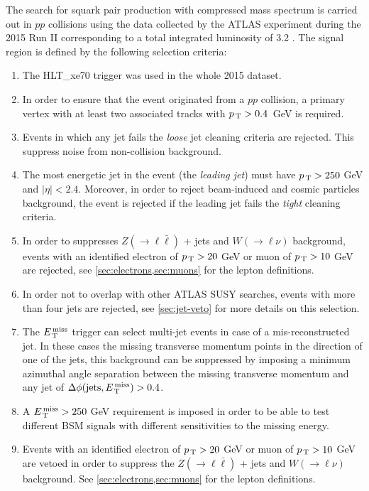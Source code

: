 The search for squark pair production with compressed mass spectrum is carried
out in $pp$ collisions using the data collected by the ATLAS experiment during
the 2015 Run II corresponding to a total integrated luminosity of 3.2 \ifb. The
signal region is defined by the following selection criteria:
\begin{enumerate}[A -]
\item The HLT\_xe70 trigger was used in the whole 2015 dataset.
\item In order to ensure that the event originated from a $pp$ collision, a
  primary vertex with at least two associated tracks with $p_\mathrm{\, T} > 0.4$~GeV is
  required.
\item Events in which any jet fails the \emph{loose} jet cleaning criteria are
  rejected. This suppress noise from non-collision background.
\item The most energetic jet in the event (the \emph{leading jet}) must have
  $p_\mathrm{\, T} > 250~$GeV and $|\eta| < 2.4$. Moreover, in order to reject beam-induced
  and cosmic particles background, the event is rejected if the leading jet
  fails the \emph{tight} cleaning criteria.
\item In order to suppresses $Z (\rightarrow \ell \bar{\ell})$ + jets and
  $W (\rightarrow \ell \nu)$ background, events with an identified electron of
  $p_\mathrm{\, T} > 20~$GeV or muon of $p_\mathrm{\, T} > 10~$GeV are rejected, see
  \cref{sec:electrons,sec:muons} for the lepton definitions.
\item In order not to overlap with other ATLAS SUSY searches, events with more
  than four jets are rejected, see \cref{sec:jet-veto} for more details on this
  selection.
\item The $E_\mathrm{\, T}^\mathrm{\, miss}$ trigger can select multi-jet events in case of a
  mis-reconstructed jet. In these cases the missing transverse momentum points
  in the direction of one of the jets, this background can be suppressed by
  imposing a minimum azimuthal angle separation between the missing transverse
  momentum and any jet of $\Delta \phi (\mathrm{jets}, E_\mathrm{\, T}^\mathrm{\, miss}) > 0.4$.
\item A $E_\mathrm{\, T}^\mathrm{\, miss} > 250~$GeV requirement is imposed in order to be able to test
  different BSM signals with different sensitivities to the missing energy.
\item Events with an identified electron of $p_\mathrm{\, T} > 20~$GeV or muon of
  $p_\mathrm{\, T} > 10~$GeV are vetoed in order to suppress the
  $Z (\rightarrow \ell \bar{\ell})$ + jets and $W (\rightarrow \ell \nu)$
  background. See \cref{sec:electrons,sec:muons} for the lepton definitions.
\end{enumerate}
